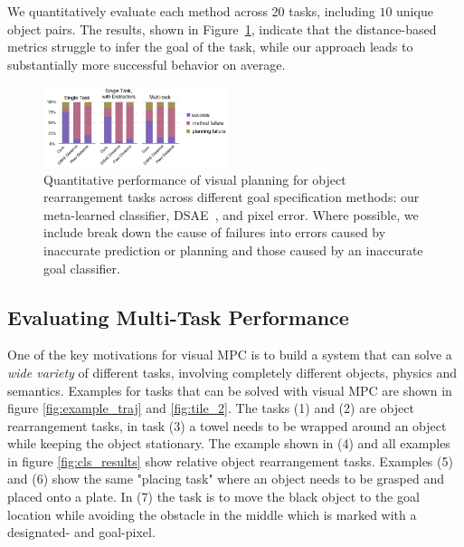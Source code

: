 We quantitatively evaluate each method across 20 tasks, including $10$ unique object pairs. The results, shown in Figure~\ref{fig:cls_charts}, indicate that the distance-based metrics struggle to infer the goal of the task, while our approach leads to substantially more successful behavior on average.








\begin{figure}
    \centering
    \includegraphics[width=0.48\textwidth]{images_cls/cls_charts.jpeg}
    \caption{\small Quantitative performance of visual planning for object rearrangement tasks across different goal specification methods: our meta-learned classifier, DSAE~\cite{dsae}, and pixel error. Where possible, we include break down the cause of failures into errors caused by inaccurate prediction or planning and those caused by an inaccurate goal classifier.}
    \label{fig:cls_charts}
    \vspace{-0.3cm}
\end{figure}


\subsection{Evaluating Multi-Task Performance}
\label{subsec:multi_task_bench}
One of the key motivations for visual MPC is to build a system that can solve a \emph{wide variety} of different tasks, involving completely different objects, physics and semantics. Examples for tasks that can be solved with visual MPC are shown in figure \ref{fig:example_traj} and \ref{fig:tile_2}. The tasks (1) and (2) are object rearrangement tasks, in task (3) a towel needs to be wrapped around an object while keeping the object stationary. The example shown in (4) and all examples in figure \ref{fig:cls_results} show relative object rearrangement tasks. Examples (5) and (6) show the same "placing task" where an object needs to be grasped and placed onto a plate. In (7) the task is to move the black object to the goal location while avoiding the obstacle in the middle which is marked with a designated- and goal-pixel.


